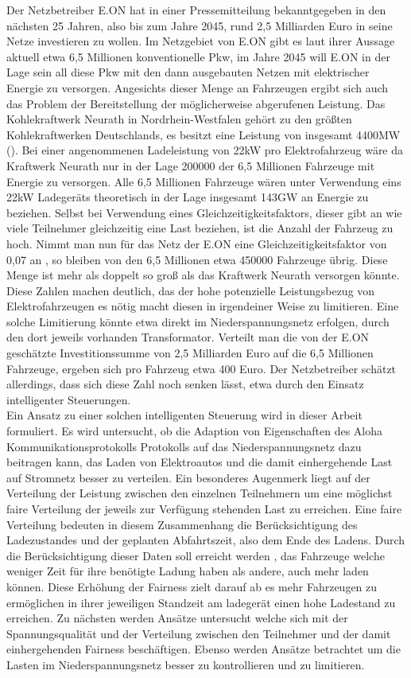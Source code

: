 Der Netzbetreiber E.ON hat in einer Pressemitteilung \cite{eon_presse} bekanntgegeben in den nächsten 25 Jahren, also bis zum Jahre 2045, rund 2,5 Milliarden Euro in seine Netze investieren zu wollen. Im Netzgebiet von E.ON gibt es laut ihrer Aussage aktuell etwa 6,5 Millionen konventionelle Pkw, im Jahre 2045 will E.ON in der Lage sein all diese Pkw mit den dann ausgebauten Netzen mit elektrischer Energie zu versorgen. Angesichts dieser Menge an Fahrzeugen ergibt sich auch das Problem der Bereitstellung der möglicherweise abgerufenen Leistung. Das Kohlekraftwerk Neurath in Nordrhein-Westfalen gehört zu den größten Kohlekraftwerken Deutschlands, es besitzt eine Leistung von insgesamt 4400MW (\cite{power}). Bei einer angenommenen Ladeleistung von 22kW pro Elektrofahrzeug wäre da Kraftwerk Neurath nur in der Lage 200000 der 6,5 Millionen Fahrzeuge mit Energie zu versorgen. Alle 6,5 Millionen Fahrzeuge wären unter Verwendung eins 22kW Ladegeräts theoretisch in der Lage insgesamt 143GW an Energie zu beziehen. 
Selbst bei Verwendung eines Gleichzeitigkeitsfaktors, dieser gibt an wie viele Teilnehmer gleichzeitig eine Last beziehen, ist die Anzahl der Fahrzeug zu hoch. Nimmt man nun für das Netz der E.ON eine Gleichzeitigkeitsfaktor von 0,07 an \cite{gust_2014}, so bleiben von den 6,5 Millionen etwa 450000 Fahrzeuge übrig. Diese Menge ist mehr als doppelt so groß als das Kraftwerk Neurath versorgen könnte. Diese Zahlen machen deutlich, das der hohe potenzielle Leistungsbezug von Elektrofahrzeugen es nötig macht diesen in irgendeiner Weise zu limitieren. Eine solche Limitierung könnte etwa direkt im Niederspannungsnetz erfolgen, durch den dort jeweils vorhanden Transformator. Verteilt man die von der E.ON geschätzte Investitionssumme von 2,5 Milliarden Euro auf die 6,5 Millionen Fahrzeuge, ergeben sich pro Fahrzeug etwa 400 Euro. Der Netzbetreiber schätzt allerdings, dass sich diese Zahl noch senken lässt, etwa durch den Einsatz intelligenter Steuerungen. \\
Ein Ansatz zu einer solchen intelligenten Steuerung wird in dieser Arbeit formuliert. Es wird untersucht, ob die Adaption von Eigenschaften des Aloha Kommunikationsprotokolls Protokolls auf das Niederspannungsnetz dazu beitragen kann, das Laden von Elektroautos und die damit einhergehende Last auf Stromnetz besser zu verteilen. Ein besonderes Augenmerk liegt auf der Verteilung der Leistung zwischen den einzelnen Teilnehmern um eine möglichst faire Verteilung der jeweils zur Verfügung stehenden Last zu erreichen. Eine faire Verteilung bedeuten in diesem Zusammenhang die Berücksichtigung des Ladezustandes und der geplanten Abfahrtszeit, also dem Ende des Ladens. Durch die Berücksichtigung dieser Daten soll erreicht werden , das Fahrzeuge welche weniger Zeit für ihre benötigte Ladung haben als andere, auch mehr laden können. Diese Erhöhung der Fairness zielt darauf ab es mehr Fahrzeugen zu ermöglichen in ihrer jeweiligen Standzeit am ladegerät einen hohe Ladestand zu erreichen. Zu nächsten werden Ansätze untersucht welche sich mit der Spannungsqualität und der Verteilung zwischen den Teilnehmer und der damit einhergehenden Fairness beschäftigen. Ebenso werden Ansätze betrachtet um die Lasten im Niederspannungsnetz besser zu kontrollieren und zu limitieren.
